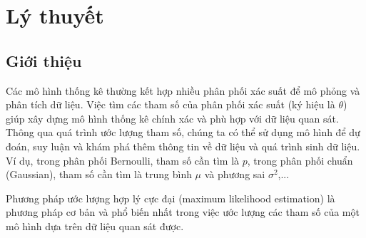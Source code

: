 \documentclass[12pt]{article}
\begin{document}
\begin{center}
\begin{center}
\end{center}
\end{center}

\vfill %

\section{Lý thuyết}

\subsection{Giới thiệu}

{\fontsize{13}{16}\selectfont
\setlength{\parskip}{0.3cm}
Các mô hình thống kê thường kết hợp nhiều phân phối xác suất để mô phỏng và phân tích dữ liệu. Việc tìm các tham số của phân phối xác suất (ký hiệu là $\theta$) giúp xây dựng mô hình thống kê chính xác và phù hợp với dữ liệu quan sát. Thông qua quá trình ước lượng tham số, chúng ta có thể sử dụng mô hình để dự đoán, suy luận và khám phá thêm thông tin về dữ liệu và quá trình sinh dữ liệu. Ví dụ, trong phân phối Bernoulli, tham số cần tìm là $p$, trong phân phối chuẩn (Gaussian), tham số cần tìm là trung bình $\mu$ và phương sai $\sigma^2$,...

\noindent Phương pháp ước lượng hợp lý cực đại (maximum likelihood estimation) là phương pháp cơ bản và phổ biến nhất trong việc ước lượng các tham số của một mô hình dựa trên dữ liệu quan sát được.
}
\end{document}
